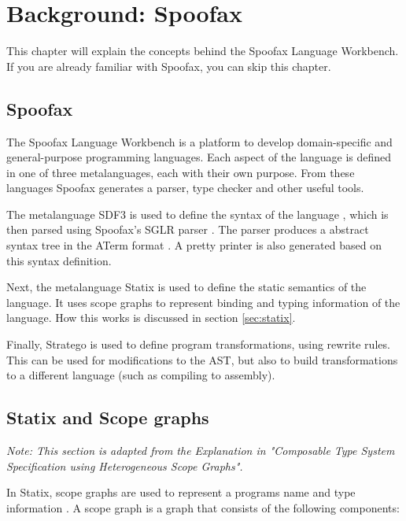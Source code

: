 \chapter{\label{chap:bg-spoofax}Background: Spoofax}

This chapter will explain the concepts behind the Spoofax Language Workbench. If you are already familiar with Spoofax, you can skip this chapter. 

\section{Spoofax}

The Spoofax Language Workbench \cite{spoofax} is a platform to develop domain-specific and
general-purpose programming languages. Each aspect of the language is defined in one of three metalanguages, each with their own purpose. From these languages Spoofax generates a parser, type checker and other useful tools. 

The metalanguage SDF3 is used to define the syntax of the language \cite{sdf3}, which is then parsed using Spoofax's SGLR parser \cite{sdf3_parser}. The parser produces a abstract syntax tree in the ATerm format \cite{aterm}. A pretty printer is also generated based on this syntax definition. 

Next, the metalanguage Statix \cite{scopes_as_types} is used to define the static semantics of the language. It uses scope graphs to represent binding and typing information of the language. How this works is discussed in section \ref{sec:statix}.

Finally, Stratego \cite{stratego} is used to define program transformations, using rewrite rules. This can be used for modifications to the AST, but also to build transformations to a different language (such as compiling to assembly). 

\section{\label{sec:statix} Statix and Scope graphs}

\textit{Note: This section is adapted from the Explanation in "Composable Type System Specification
	using Heterogeneous Scope Graphs". \cite[sect. 4.1.2]{Zwaan21}}

In Statix, scope graphs are used to represent a programs name and type information \cite{scopes_as_types}. A scope graph is a graph that consists of the following components:

